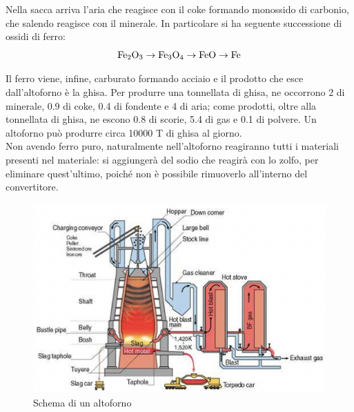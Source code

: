Nella sacca arriva l’aria che reagisce con il coke formando monossido di carbonio, che salendo reagisce con il minerale.
In particolare si ha seguente successione di ossidi di ferro: 
\begin{equation*}
    \bold{\mathrm{Fe_2O_3\to Fe_3O_4 \to FeO \to Fe}}
\end{equation*}

Il ferro viene, infine, carburato formando acciaio e il prodotto che esce dall’altoforno è la ghisa.
Per produrre una tonnellata di ghisa, ne occorrono 2 di minerale, 0.9 di coke, 0.4 di fondente e 4 di aria; come prodotti, oltre alla tonnellata di ghisa, ne escono 0.8 di scorie, 5.4 di gas e 0.1 di polvere. Un altoforno può produrre circa 10000 T di ghisa al giorno.\\
Non avendo ferro puro, naturalmente nell’altoforno reagiranno tutti i materiali presenti nel materiale: si aggiungerà del sodio che reagirà con lo zolfo, per eliminare quest’ultimo, poiché non è possibile rimuoverlo all'interno del convertitore.

\begin{figure}[!hbt]
    \includegraphics[width=1\textwidth]{images/img27.png}
    \caption{Schema di un altoforno}
\end{figure}

